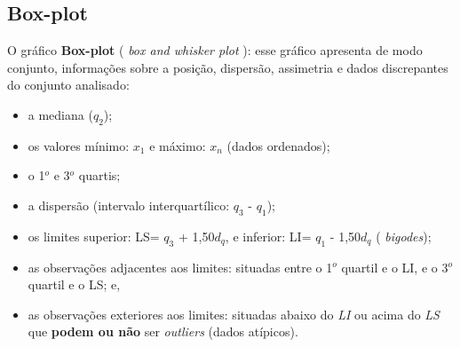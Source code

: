 \documentclass[
]{book}
\providecommand{\tightlist}{%
  \setlength{\itemsep}{0pt}\setlength{\parskip}{0pt}}
\begin{document}
\hypertarget{box-plot}{%
\subsection{Box-plot}\label{box-plot}}

O gráfico \textbf{Box-plot} ( \emph{box and whisker plot} ): esse gráfico apresenta de modo conjunto, informações sobre a posição, dispersão, assimetria e dados discrepantes do conjunto analisado:

\begin{itemize}
\tightlist
\item
  a mediana (\(q_{2}\));
\item
  os valores mínimo: \(x_{1}\) e máximo: \(x_{n}\) (dados ordenados);
\item
  o 1\(^{o}\) e 3\(^{o}\) quartis;
\item
  a dispersão (intervalo interquartílico: \(q_{3}\) - \(q_{1}\));
\item
  os limites superior: LS= \(q_{3}\) + 1,50\(d_{q}\), e inferior: LI= \(q_{1}\) - 1,50\(d_{q}\) ( \emph{bigodes});
\item
  as observações adjacentes aos limites: situadas entre o 1\(^{o}\) quartil e o LI, e o 3\(^{o}\) quartil e o LS; e,
\item
  as observações exteriores aos limites: situadas abaixo do \emph{LI} ou acima do \emph{LS} que \textbf{podem ou não} ser \emph{outliers} (dados atípicos).
\end{itemize}
\end{document}
